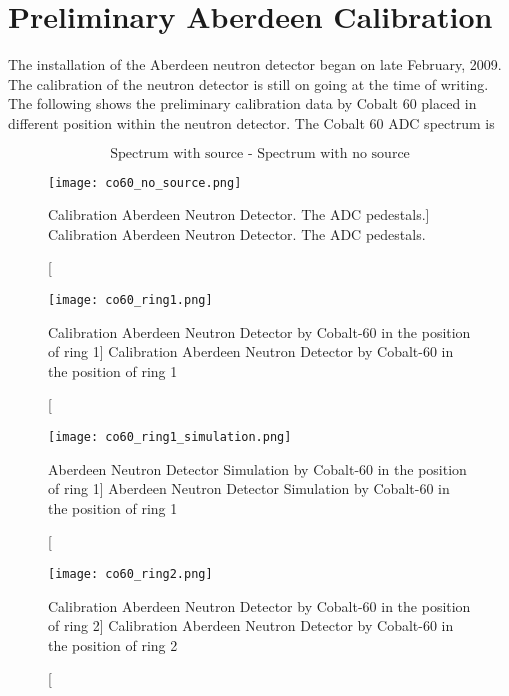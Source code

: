 \section {Preliminary Aberdeen Calibration}

The installation of the Aberdeen neutron detector began on late February, 2009.
The calibration of the neutron detector is still on going at the time of writing.
The following shows the preliminary calibration data by Cobalt 60 placed in different
position within the neutron detector. The Cobalt 60 ADC spectrum is


\begin{equation}
\label{equ:co60Spectrum}
\mbox{Spectrum with source - Spectrum with no source}
\end{equation}


\begin{figure}
    \centering
    \texttt{[image: co60\_no\_source.png]}
    \caption
    [Calibration Aberdeen Neutron Detector. The ADC pedestals.]
    {Calibration Aberdeen Neutron Detector. The ADC pedestals.}
    \label{fig:co60_no_source.png}
    \end{figure}


\begin{figure}
    \centering
    \texttt{[image: co60\_ring1.png]}
    \caption
    [Calibration Aberdeen Neutron Detector by Cobalt-60 in the position of ring 1]
    {Calibration Aberdeen Neutron Detector by Cobalt-60 in the position of ring 1}
    \label{fig:co60_ring1.png}
    \end{figure}


\begin{figure}
    \centering
    \texttt{[image: co60\_ring1\_simulation.png]}
    \caption
    [Aberdeen Neutron Detector Simulation by Cobalt-60 in the position of ring 1]
    {Aberdeen Neutron Detector Simulation by Cobalt-60 in the position of ring 1}
    \label{fig:co60_ring1_simulation}
    \end{figure}





\begin{figure}
    \centering
    \texttt{[image: co60\_ring2.png]}
    \caption
    [Calibration Aberdeen Neutron Detector by Cobalt-60 in the position of ring 2]
    {Calibration Aberdeen Neutron Detector by Cobalt-60 in the position of ring 2}
    \label{fig:co60_ring2.png}
    \end{figure}


